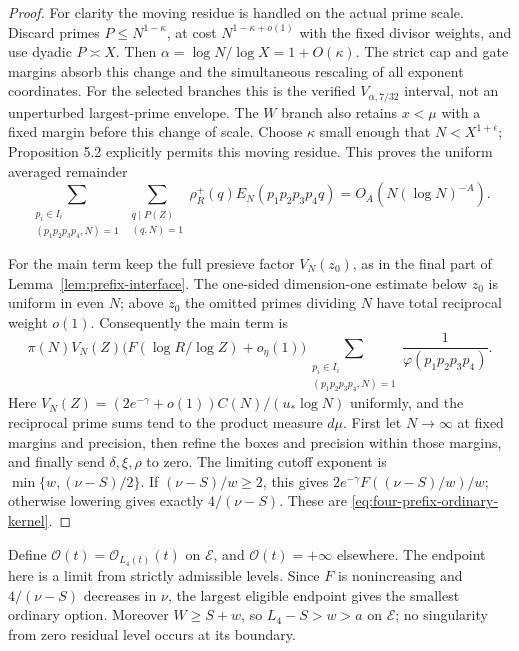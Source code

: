 \begin{proof}
For clarity the moving residue is handled on the actual prime
scale.  Discard primes $P\le N^{1-\kappa}$, at cost
$N^{1-\kappa+o(1)}$ with the fixed divisor weights, and use dyadic
$P\asymp X$.  Then $\alpha=\log N/\log X=1+O(\kappa)$.
The strict cap and gate margins absorb this change and the
simultaneous rescaling of all exponent coordinates.  For the
selected branches this is the verified
$V_{\alpha,7/32}$ interval, not an unperturbed largest-prime
envelope.  The $W$ branch also retains $x<\mu$ with a fixed
margin before this change of scale.  Choose $\kappa$ small enough
that $N<X^{1+\epsilon}$; Proposition 5.2 explicitly permits this
moving residue.  This proves the uniform averaged remainder
\[
 \sum_{\substack{p_i\in I_i\\(p_1p_2p_3p_4,N)=1}}
 \sum_{\substack{q\mid P(Z)\\(q,N)=1}}
 \rho_R^+(q)E_N(p_1p_2p_3p_4q)
 =O_A(N(\log N)^{-A}).
\]

For the main term keep the full presieve factor $V_N(z_0)$, as in
the final part of Lemma~\ref{lem:prefix-interface}.  The one-sided
dimension-one estimate below $z_0$ is uniform in even $N$; above
$z_0$ the omitted primes dividing $N$ have total reciprocal weight
$o(1)$.  Consequently the main term is
\[
 \pi(N)V_N(Z)\bigl(F(\log R/\log Z)+o_\eta(1)\bigr)
 \sum_{\substack{p_i\in I_i\\(p_1p_2p_3p_4,N)=1}}
       \frac1{\varphi(p_1p_2p_3p_4)}.
\]
Here $V_N(Z)=(2e^{-\gamma}+o(1))C(N)/(u_*\log N)$ uniformly,
and the reciprocal prime sums tend to the product measure $d\mu$.
First let $N\to\infty$ at fixed margins and precision, then refine
the boxes and precision within those margins, and finally send
$\delta,\xi,\rho$ to zero.  The limiting cutoff exponent is
$\min\{w,(\nu-S)/2\}$.  If $(\nu-S)/w\ge2$, this gives
$2e^{-\gamma}F((\nu-S)/w)/w$; otherwise lowering gives exactly
$4/(\nu-S)$.  These are \eqref{eq:four-prefix-ordinary-kernel}.
\end{proof}

Define $\mathcal O(t)=\mathcal O_{L_4(t)}(t)$ on $\mathcal E$,
and $\mathcal O(t)=+\infty$ elsewhere.  The endpoint here is a limit
from strictly admissible levels.  Since $F$ is nonincreasing and
$4/(\nu-S)$ decreases in $\nu$, the largest eligible endpoint
gives the smallest ordinary option.  Moreover $W\ge S+w$, so
$L_4-S>w>a$ on $\mathcal E$; no singularity from zero residual
level occurs at its boundary.

